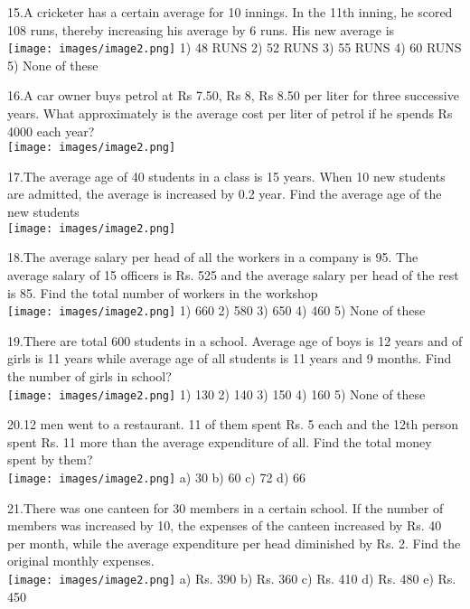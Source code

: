 \documentclass[
]{article}
\begin{document}
15.A cricketer has a certain average for 10 innings. In the 11th inning, he scored 108 runs, thereby increasing his average by 6 runs. His new average is   \\
\texttt{[image: images/image2.png]}  	1) 48 RUNS 	2) 52 RUNS 	3) 55 RUNS 	4) 60 RUNS 	5) None of these

16.A car owner buys petrol at Rs 7.50, Rs 8, Rs 8.50 per liter for three successive years. What approximately is the average cost per liter of petrol if he spends Rs 4000 each year?  \\
\texttt{[image: images/image2.png]}  

17.The average age of 40 students in a class is 15 years. When 10 new students are admitted, the average is increased by 0.2 year. Find the average age of the new students  \\
\texttt{[image: images/image2.png]}  

18.The average salary per head of all the workers in a company is 95. The average salary of 15 officers is Rs. 525 and the average salary per head of the rest is 85. Find the total number of workers in the workshop   \\
\texttt{[image: images/image2.png]}  1) 660 	2) 580 	3) 650 	4) 460 	5) None of these

19.There are total 600 students in a school. Average age of boys is 12 years and of girls is 11 years while average age of all students is 11 years and 9 months. Find the number of girls in school?   \\
\texttt{[image: images/image2.png]}  1) 130 	2) 140 	3) 150 	4) 160 	5) None of these

20.12 men went to a restaurant. 11 of them spent Rs. 5 each and the 12th person spent Rs. 11 more than the average expenditure of all. Find the total money spent by them?   \\
\texttt{[image: images/image2.png]}  a) 30 	b) 60 	c) 72 	d) 66

21.There was one canteen for 30 members in a certain school. If the number of members was increased by 10, the expenses of the canteen increased by Rs. 40 per month, while the average expenditure per head diminished by Rs. 2. Find the original monthly expenses.   \\
\texttt{[image: images/image2.png]}  a) Rs. 390 	b) Rs. 360 	c) Rs. 410 	d) Rs. 480 	e) Rs. 450
\end{document}
